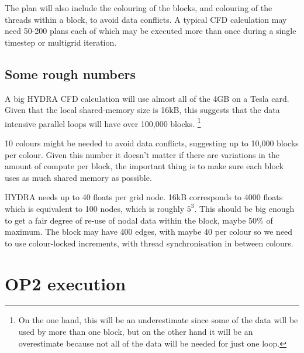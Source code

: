 \documentclass[12pt]{article}
\begin{document}
The plan will also include the colouring of the blocks, and colouring 
of the threads within a block, to avoid data conflicts.  A typical CFD 
calculation may need 50-200 plans each of which may be executed more 
than once during a single timestep or multigrid iteration.

\subsection{Some rough numbers}

A big HYDRA CFD calculation will use almost all of the 4GB 
on a Tesla card. Given that the local shared-memory size is 16kB, 
this suggests that the data intensive parallel loops will have 
over 100,000 blocks. 
\footnote{On the one hand, this will be an underestimate 
since some of the data will be used by more than one block, 
but on the other hand it will be an overestimate 
because not all of the data will be needed for just one loop.}

10 colours might be needed to avoid data conflicts, suggesting 
up to 10,000 blocks per colour.  Given this number it doesn't 
matter if there are variations in the amount of compute per 
block, the important thing is to make sure each block uses as 
much shared memory as possible.

HYDRA needs up to 40 floats per grid node.  16kB corresponds
to 4000 floats which is equivalent to 100 nodes, which is 
roughly $5^3$.  This should be big enough to get a fair degree 
of re-use of nodal data within the block, maybe 50\% of
maximum.  The block may have 400 edges, with maybe 40 per 
colour so we need to use colour-locked increments, with thread 
synchronisation in between colours.


\newpage

\section{OP2 execution}
\end{document}
